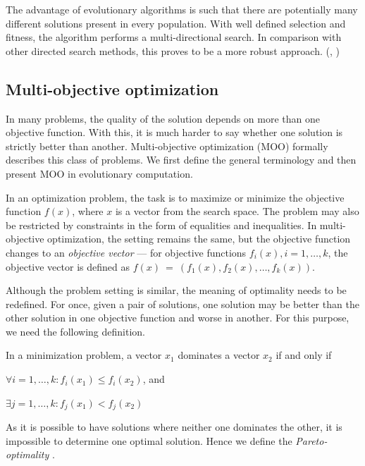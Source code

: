 The advantage of evolutionary algorithms is such that there are potentially 
many different solutions present in every population. With well defined 
selection and fitness, the algorithm performs a multi-directional search. 
In comparison with other directed search methods, this proves to be a more 
robust approach. (\cite{Michalewicz:1996:GAD:229930}, 
\cite{Mitchell:1997:ML:541177}) %

\subsection{Multi-objective optimization} \label{moo}
In many problems, the quality of the solution depends on more than one
objective function. With this, it is much harder to say whether one solution
is strictly better than another. Multi-objective optimization (MOO) formally
describes this class of problems. We first define the general terminology
and then present MOO in evolutionary computation.

In an optimization problem, the task is to maximize or minimize the objective
function $f(x)$, where $x$ is a vector from the search space. The problem may
also be restricted by constraints in the form of equalities and inequalities.
In multi-objective optimization, the setting remains the same, but the
objective function changes to an \emph{objective vector} ---
for objective functions $f_i(x), i = 1,\ldots,k$, the objective vector is 
defined as $f(x)~=~(f_1(x), f_2(x), \ldots, f_k(x))$.

Although the problem setting is similar, the meaning of optimality needs to 
be redefined. For once, given a pair of solutions, one solution may be better 
than the other solution in one objective function and worse in another. For 
this purpose, we need the following definition.

\begin{definition}[Domination]
In a minimization problem, a vector $x_1$ dominates a vector $x_2$ if and 
only if 
\begin{compactitem}
\item $\forall i=1,\ldots,k: f_i(x_1) \leq f_i(x_2)$, and
\item $\exists j=1,\ldots,k: f_j(x_1) < f_j(x_2)$
\end{compactitem}
\end{definition}

As it is possible to have solutions where neither one dominates the other,
it is impossible to determine one optimal solution. Hence we define the 
\emph{Pareto-optimality}
\citep[p.~551-561,~569--573]{Engelbrecht:2007:CII:1557464}.

